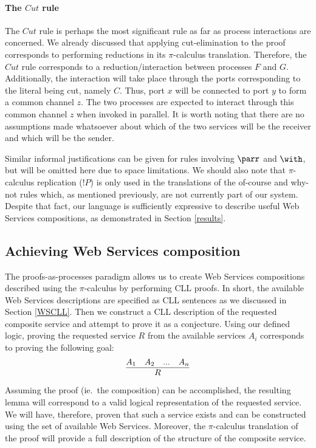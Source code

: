 \documentclass[copyright,creativecommons]{eptcs}
\begin{document}
\paragraph{The $Cut$ rule} The $Cut$ rule is perhaps the most significant rule as far as process interactions are concerned. We already discussed that applying cut-elimination to the proof corresponds to performing reductions in its $\pi$-calculus translation. Therefore, the $Cut$ rule corresponds to a reduction/interaction between processes $F$ and $G$. Additionally, the interaction will take place through the ports corresponding to the literal being cut, namely $C$. Thus, port $x$ will be connected to port $y$ to form a common channel $z$. The two processes are expected to interact through this common channel $z$ when invoked in parallel. It is worth noting that there are no assumptions made whatsoever about which of the two services will be the receiver and which will be the sender.

Similar informal justifications can be given for rules involving $\parr$ and $\with$, but will be omitted here due to space limitations. We should also note that $\pi$-calculus replication ($!P$) is only used in the translations of the of-course and why-not rules which, as mentioned previously, are not currently part of our system. Despite that fact, our language is sufficiently expressive to describe useful Web Services compositions, as demonstrated in Section \ref{results}.

\subsection{Achieving Web Services composition}
\label{wscomp}

The proofs-as-processes paradigm allows us to create Web Services compositions described using the $\pi$-calculus by performing CLL proofs. In short, the available Web Services descriptions are specified as CLL sentences as we discussed in Section \ref{WSCLL}. Then we construct a CLL description of the requested composite service and attempt to prove it as a conjecture. Using our defined logic, proving the requested service $R$ from the available services $A_i$ corresponds to proving the following goal:
\[
	\infer{R}{A_1 & A_2 & ... & A_n}
\]

Assuming the proof (ie.\ the composition) can be accomplished, the resulting lemma will correspond to a valid logical representation of the requested service. We will have, therefore, proven that such a service exists and can be constructed using the set of available Web Services. Moreover, the $\pi$-calculus translation of the proof will provide a full description of the structure of the composite service.
\end{document}
